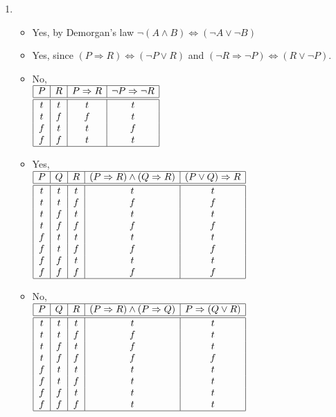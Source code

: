 \documentclass[10pt]{article}
\begin{document}
\begin{enumerate}
\item %
  \begin{itemize}
  \item Yes, by Demorgan's law 
        $\neg (A \land B) \Leftrightarrow (\neg A \lor \neg B)$
  \item Yes, since $(P \Rightarrow R) \Leftrightarrow (\neg P \lor R)$ and
        $(\neg R \Rightarrow \neg P) \Leftrightarrow (R \lor \neg P)$.
  \item No,\\
    \begin{math}
    \begin{array}{|c|c|c|c|}
      \hline
      P & R & P \Rightarrow R & \neg P \Rightarrow \neg R \\
      \hline \hline
      t & t & t & t \\
      t & f & f & t \\
      f & t & t & f \\
      f & f & t & t \\
      \hline
    \end{array}
    \end{math}
  \item Yes,\\
    \begin{math}
    \begin{array}{|c|c|c|c|c|}
      \hline
      P & Q & R & (P \Rightarrow R) \land (Q \Rightarrow R) & (P \lor Q) \Rightarrow R \\
      \hline \hline
      t & t & t & t & t \\
      t & t & f & f & f \\
      t & f & t & t & t \\
      t & f & f & f & f \\
      f & t & t & t & t \\
      f & t & f & f & f \\
      f & f & t & t & t \\
      f & f & f & f & f \\
      \hline
    \end{array}
    \end{math}
  \item No,\\
    \begin{math}
    \begin{array}{|c|c|c|c|c|}
      \hline
      P & Q & R & (P \Rightarrow R) \land (P \Rightarrow Q) & P \Rightarrow (Q \lor R) \\
      \hline \hline
      t & t & t & t & t \\
      t & t & f & f & t \\
      t & f & t & f & t \\
      t & f & f & f & f \\
      f & t & t & t & t \\
      f & t & f & t & t \\
      f & f & t & t & t \\
      f & f & f & t & t \\
      \hline
    \end{array}
    \end{math}
  \end{itemize}


\end{enumerate}
\end{document}
